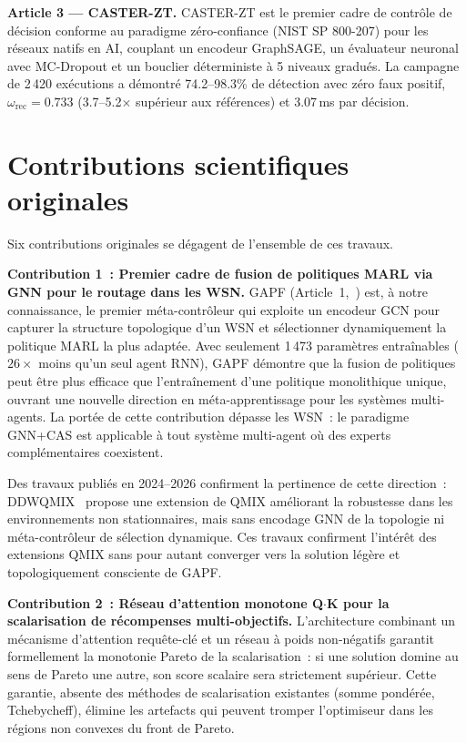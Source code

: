\textbf{Article 3 --- CASTER-ZT.}
CASTER-ZT est le premier cadre de contrôle de décision conforme au paradigme zéro-confiance (NIST SP 800-207) pour les réseaux natifs en AI, couplant un encodeur GraphSAGE, un évaluateur neuronal avec MC-Dropout et un bouclier déterministe à 5 niveaux gradués. La campagne de 2\,420 exécutions a démontré 74.2--98.3\% de détection avec zéro faux positif, $\omega_{\text{rec}} = 0.733$ (3.7--5.2$\times$ supérieur aux références) et 3.07\,ms par décision.


\section{Contributions scientifiques originales}\label{sec:concl-contributions}

Six contributions originales se dégagent de l'ensemble de ces travaux.

\textbf{Contribution 1~: Premier cadre de fusion de politiques MARL via GNN pour le routage dans les WSN.}
GAPF (Article~1,~\cite{gapf_tgcn2026}) est, à notre connaissance, le premier méta-contrôleur qui exploite un encodeur GCN pour capturer la structure topologique d'un WSN et sélectionner dynamiquement la politique MARL la plus adaptée. Avec seulement 1\,473 paramètres entraînables ($26\times$ moins qu'un seul agent RNN), GAPF démontre que la fusion de politiques peut être plus efficace que l'entraînement d'une politique monolithique unique, ouvrant une nouvelle direction en méta-apprentissage pour les systèmes multi-agents. La portée de cette contribution dépasse les WSN~: le paradigme GNN+CAS est applicable à tout système multi-agent où des experts complémentaires coexistent.

Des travaux publiés en 2024--2026 confirment la pertinence de cette direction~: DDWQMIX~\cite{ddwqmix_cac2024} propose une extension de QMIX améliorant la robustesse dans les environnements non stationnaires, mais sans encodage GNN de la topologie ni méta-contrôleur de sélection dynamique. Ces travaux confirment l'intérêt des extensions QMIX sans pour autant converger vers la solution légère et topologiquement consciente de GAPF.

\textbf{Contribution 2~: Réseau d'attention monotone Q$\cdot$K pour la scalarisation de récompenses multi-objectifs.}
L'architecture combinant un mécanisme d'attention requête-clé et un réseau à poids non-négatifs garantit formellement la monotonie Pareto de la scalarisation~: si une solution domine au sens de Pareto une autre, son score scalaire sera strictement supérieur. Cette garantie, absente des méthodes de scalarisation existantes (somme pondérée, Tchebycheff), élimine les artefacts qui peuvent tromper l'optimiseur dans les régions non convexes du front de Pareto.

